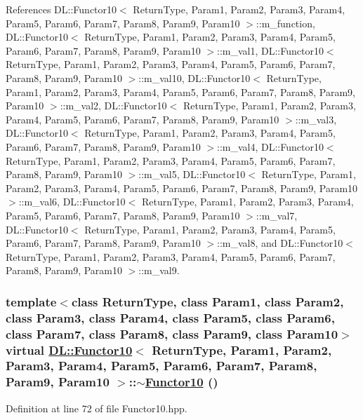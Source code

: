 References DL::Functor10$<$ Return\-Type, Param1, Param2, Param3, Param4, Param5, Param6, Param7, Param8, Param9, Param10 $>$::m\_\-function, DL::Functor10$<$ Return\-Type, Param1, Param2, Param3, Param4, Param5, Param6, Param7, Param8, Param9, Param10 $>$::m\_\-val1, DL::Functor10$<$ Return\-Type, Param1, Param2, Param3, Param4, Param5, Param6, Param7, Param8, Param9, Param10 $>$::m\_\-val10, DL::Functor10$<$ Return\-Type, Param1, Param2, Param3, Param4, Param5, Param6, Param7, Param8, Param9, Param10 $>$::m\_\-val2, DL::Functor10$<$ Return\-Type, Param1, Param2, Param3, Param4, Param5, Param6, Param7, Param8, Param9, Param10 $>$::m\_\-val3, DL::Functor10$<$ Return\-Type, Param1, Param2, Param3, Param4, Param5, Param6, Param7, Param8, Param9, Param10 $>$::m\_\-val4, DL::Functor10$<$ Return\-Type, Param1, Param2, Param3, Param4, Param5, Param6, Param7, Param8, Param9, Param10 $>$::m\_\-val5, DL::Functor10$<$ Return\-Type, Param1, Param2, Param3, Param4, Param5, Param6, Param7, Param8, Param9, Param10 $>$::m\_\-val6, DL::Functor10$<$ Return\-Type, Param1, Param2, Param3, Param4, Param5, Param6, Param7, Param8, Param9, Param10 $>$::m\_\-val7, DL::Functor10$<$ Return\-Type, Param1, Param2, Param3, Param4, Param5, Param6, Param7, Param8, Param9, Param10 $>$::m\_\-val8, and DL::Functor10$<$ Return\-Type, Param1, Param2, Param3, Param4, Param5, Param6, Param7, Param8, Param9, Param10 $>$::m\_\-val9.\hypertarget{classDL_1_1Functor10_a1}{
\subsubsection[$\sim$Functor10]{\setlength{\rightskip}{0pt plus 5cm}template$<$class Return\-Type, class Param1, class Param2, class Param3, class Param4, class Param5, class Param6, class Param7, class Param8, class Param9, class Param10$>$ virtual \hyperlink{classDL_1_1Functor10}{DL::Functor10}$<$ Return\-Type, Param1, Param2, Param3, Param4, Param5, Param6, Param7, Param8, Param9, Param10 $>$::$\sim$\hyperlink{classDL_1_1Functor10}{Functor10} ()}}
\label{classDL_1_1Functor10_a1}




Definition at line 72 of file Functor10.hpp.

